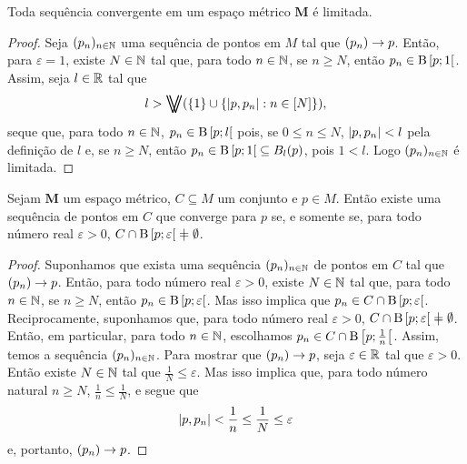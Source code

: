 \begin{proposition}
Toda sequência convergente em um espaço métrico $\bm M$ é limitada.
\end{proposition}
\begin{proof}
	Seja $(p_n)_{n \in \mathbb{N}}$ uma sequência de pontos em $M$ tal que $(p_n) \rightarrow p$. Então, para $\varepsilon = 1$, existe $N \in \mathbb{N}$ tal que, para todo $n \in \mathbb{N}$, se $n \geq N$, então $p_n \in \mathrm{B}\left[{p};{1}\right[$. Assim, seja $l \in \mathbb{R}$ tal que
	\begin{equation*}
	l > \max(\{1\} \cup \{\dist{p}{p_n} : n \in [N]\}),
	\end{equation*}
seque que, para todo $n \in \mathbb{N}$, $p_n \in \mathrm{B}\left[{p};{l}\right[$ pois, se $0 \leq n \leq N$, $\left\vert{p},{p_n}\right\vert < l$ pela definição de $l$ e, se $n \geq N$, então $p_n \in \mathrm{B}\left[{p};{1}\right[ \subseteq B_l(p)$, pois $1 < l$. Logo $(p_n)_{n \in \mathbb{N}}$ é limitada.
\end{proof}

\begin{proposition}
Sejam $\bm M$ um espaço métrico, $C \subseteq M$ um conjunto e $p \in M$. Então existe uma sequência de pontos em $C$ que converge para $p$ se, e somente se, para todo número real $\varepsilon > 0$, $C \cap \bola{p}{\varepsilon} \neq \emptyset$.
\end{proposition}
\begin{proof}
	Suponhamos que exista uma sequência $(p_n)_{n \in \mathbb{N}}$ de pontos em $C$ tal que $(p_n) \rightarrow p$. Então, para todo número real $\varepsilon > 0$, existe $N \in \mathbb{N}$ tal que, para todo $n \in \mathbb{N}$, se $n \geq N$, então $p_n \in \mathrm{B}\left[{p};{\varepsilon}\right[$. Mas isso implica que $p_n \in C \cap \mathrm{B}\left[{p};{\varepsilon}\right[$. Reciprocamente, suponhamos que, para todo número real $\varepsilon > 0$, $C \cap \bola{p}{\varepsilon} \neq \emptyset$. Então, em particular, para todo $n \in \mathbb{N}$, escolhamos $p_n \in C \cap \mathrm{B}\left[{p};{\frac{1}{n}}\right[$. Assim, temos a sequência $(p_n)_{n \in \mathbb{N}}$. Para mostrar que $(p_n) \rightarrow p$, seja $\varepsilon \in \mathbb{R}$ tal que $\varepsilon > 0$. Então existe $N \in \mathbb{N}$ tal que $\frac{1}{N} \leq \varepsilon$. Mas isso implica que, para todo número natural $n \geq N$, $\frac{1}{n} \leq \frac{1}{N}$, e segue que
	\begin{equation*}
	\left\vert{p},{p_n}\right\vert < \frac{1}{n} \leq \frac{1}{N} \leq \varepsilon
	\end{equation*}
e, portanto, $(p_n) \rightarrow p$.
\end{proof}

